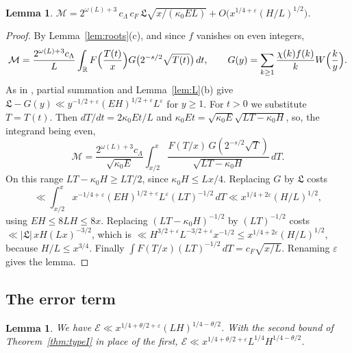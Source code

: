 \documentclass[11pt]{amsart}
\newtheorem{lemma}[theorem]{Lemma}
\theoremstyle{remark}
\theoremstyle{definition}
\numberwithin{equation}{section}
\newcommand{\R}{\mathbb{R}}
\newcommand{\eps}{\varepsilon}
\newcommand{\Lf}{\mathfrak{L}}
\newcommand{\Ec}{\mathcal{E}}
\newcommand{\Mt}{\mathcal{M}}
\begin{document}
\begin{lemma}\label{lem:main}
$\Mt=2^{\omega(L)+3}\,c_\Lambda\,c_F\,\Lf\sqrt{x/(\kappa_0EL)}+O\bigl(x^{1/4+\eps}(H/L)^{1/2}\bigr)$.
\end{lemma}

\begin{proof}
By Lemma~\ref{lem:roots}(c), and since $f$ vanishes on even integers,
\[
\Mt=\frac{2^{\omega(L)+3}c_\Lambda}L\int_\R F\Bigl(\frac{T(t)}x\Bigr)G\bigl(2^{-s/2}\sqrt{T(t)}\bigr)\,dt,\qquad G(y)=\sum_{k\ge1}\frac{\chi(k)f(k)}kW\Bigl(\frac ky\Bigr).
\]
As in \cite[Lemma~7.2]{IC}, partial summation and Lemma~\ref{lem:L}(b) give $\Lf-G(y)\ll y^{-1/2+\eps}(EH)^{1/2+\eps}L^\eps$ for $y\ge1$. For $t>0$ we substitute $T=T(t)$. Then $dT/dt=2\kappa_0Et/L$ and $\kappa_0Et=\sqrt{\kappa_0E}\sqrt{LT-\kappa_0H}$, so, the integrand being even,
\[
\Mt=\frac{2^{\omega(L)+3}c_\Lambda}{\sqrt{\kappa_0E}}\int_{x/2}^x\frac{F(T/x)\,G(2^{-s/2}\sqrt T)}{\sqrt{LT-\kappa_0H}}\,dT .
\]
On this range $LT-\kappa_0H\ge LT/2$, since $\kappa_0H\le Lx/4$. Replacing $G$ by $\Lf$ costs
\[
\ll\int_{x/2}^xx^{-1/4+\eps}(EH)^{1/2+\eps}L^\eps(LT)^{-1/2}\,dT\ll x^{1/4+2\eps}(H/L)^{1/2},
\]
using $EH\le8LH\le8x$. Replacing $(LT-\kappa_0H)^{-1/2}$ by $(LT)^{-1/2}$ costs $\ll|\Lf|\,xH(Lx)^{-3/2}$, which is $\ll H^{3/2+\eps}L^{-3/2+\eps}x^{-1/2}\le x^{1/4+2\eps}(H/L)^{1/2}$, because $H/L\le x^{3/4}$. Finally $\int F(T/x)(LT)^{-1/2}\,dT=c_F\sqrt{x/L}$. Renaming $\eps$ gives the lemma.
\end{proof}

\subsection{The error term}

\begin{lemma}\label{lem:error}
We have $\Ec\ll x^{1/4+\theta/2+\eps}(LH)^{1/4-\theta/2}$. With the second bound of Theorem~\ref{thm:typeI} in place of the first, $\Ec\ll x^{1/4+\theta/2+\eps}L^{1/4}H^{1/4-\theta/2}$.
\end{lemma}
\end{document}
